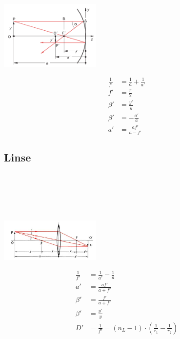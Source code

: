 \begin{boxleft}
\\
\\
\\
\includegraphics[width=50mm,keepaspectratio=true]{physik/png/optik1.png}
\end{boxleft}\begin{boxrightshaded}
\begin{align*}
\frac{1}{f'}&=\frac{1}{a}+\frac{1}{a'}\\
f'&=\frac{r}{2}\\
\beta'&=\frac{y'}{y}\\
\beta'&=-\frac{a'}{a}\\
a'&=\frac{af'}{a-f'}
\end{align*}
\end{boxrightshaded}

\subsection{Linse}

\begin{boxleft}
\\
\\
\\
\\
\\
\includegraphics[width=50mm,keepaspectratio=true]{physik/png/optik2.png}
\end{boxleft}\begin{boxrightshaded}
\begin{align*}
\frac{1}{f'}&=\frac{1}{a'}-\frac{1}{a}\\
a'&=\frac{af'}{a+f'}\\
\beta'&=\frac{f'}{a+f'}\\
\beta'&=\frac{y'}{y}\\
D'&=\frac{1}{f'}=\left(n_L-1\right)\cdot\left(\frac{1}{r_1}-\frac{1}{r_2}\right)
\end{align*}
\end{boxrightshaded}


